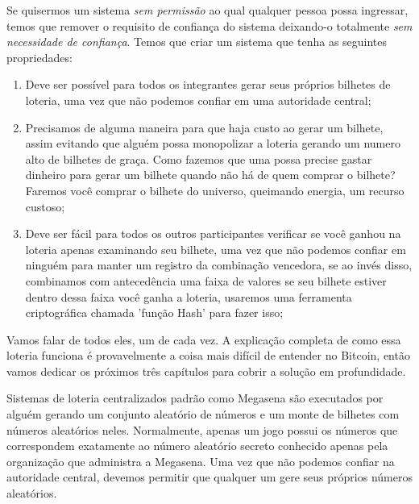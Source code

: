 Se quisermos um sistema \textit{sem permissão} ao qual qualquer pessoa possa ingressar, temos que remover o requisito de confiança do sistema deixando-o totalmente \textit{sem necessidade de confiança}. Temos que criar um sistema que tenha as seguintes propriedades:


\begin{enumerate}
\item Deve ser possível para todos os integrantes gerar seus próprios bilhetes de loteria, uma vez que não podemos confiar em uma autoridade central;%
\item Precisamos de alguma maneira para que haja custo ao gerar um bilhete, assim evitando que alguém possa monopolizar a loteria gerando um numero alto de bilhetes de graça. Como fazemos que uma possa precise gastar dinheiro para gerar um bilhete quando não há de quem comprar o bilhete? Faremos você comprar o bilhete do universo, queimando energia, um recurso custoso;
\item Deve ser fácil para todos os outros participantes verificar se você ganhou na loteria apenas examinando seu bilhete, uma vez que não podemos confiar em ninguém para manter um registro da combinação vencedora, se ao invés disso, combinamos com antecedência uma faixa de valores se seu bilhete estiver dentro dessa faixa você ganha a loteria, usaremos uma ferramenta criptográfica chamada 'função Hash' para fazer isso;

\end{enumerate}



Vamos falar de todos eles, um de cada vez. A explicação completa de como essa loteria funciona é provavelmente a coisa mais difícil de entender no Bitcoin, então vamos dedicar os próximos três capítulos para cobrir a solução em profundidade.

Sistemas de loteria centralizados padrão como Megasena são executados por alguém gerando um conjunto aleatório de números e um monte de bilhetes com números aleatórios neles. Normalmente, apenas um jogo possui os números que correspondem exatamente ao número aleatório secreto conhecido apenas pela organização que administra a Megasena. Uma vez que não podemos confiar na autoridade central, devemos permitir que qualquer um gere seus próprios números aleatórios.

